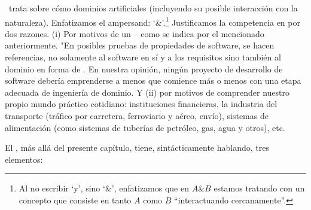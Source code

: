 \begynd
\pind  {} \primer\ trata sobre cómo  dominios artificiales
      (incluyendo su posible interacción con la naturaleza).
      \pind Enfatizamos el ampersand: `\&'.\footnote{Al no escribir `y', sino `\&', enfatizamos que en
      ${A\&B}$ estamos tratando con un  concepto que consiste en
      tanto $A$ como $B$ ``interactuando cercanamente''.}
\pind Justificamos la competencia en 
      por dos razones.
\begynd
\pind (i) Por motivos de un  -- como se indica por el  mencionado anteriormente. "En posibles pruebas de propiedades de software, se hacen referencias, no solamente al software en sí y a los requisitos sino también al dominio en forma de .
      En nuestra opinión, ningún proyecto de desarrollo de software debería
      emprenderse a menos que comience más o menos con una etapa adecuada de ingeniería
      de dominio. Y
      \pind (ii) por motivos de comprender  nuestro propio
      mundo práctico cotidiano: instituciones financieras, la industria del transporte
      (tráfico por carretera, ferroviario y aéreo, envío), sistemas de alimentación
      (como sistemas de tuberías de petróleo, gas, agua y otros), etc.
\afslut
\afslut


\label{sec:Structure}

\begynd
\pind El \primer, más allá del presente capítulo, tiene, sintácticamente
hablando, tres elementos:
\afslut

